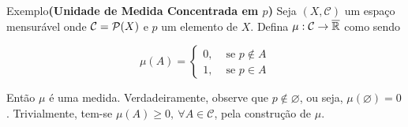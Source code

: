 \begin{env}{Exemplo}\textbf{(Unidade de Medida Concentrada em $p$)}
\label{ex:medida-concentrada-em-p}
    Seja $(X, \mathcal{C})$ um espaço mensurável onde $\operatorname{\mathcal{C}} = \mathcal{P}(X)$ e $p$ um elemento de $X$.
    Defina $\mu: \mathcal{C} \to \operatorname{\overline{\mathbb{R}}}$  como sendo

$$\mu(A) = \left\{\begin{array}{cc}
0, & \textrm{\ se \ } p \notin A \\
1, & \textrm{\ se \ } p \in A 
\end{array}\right.$$


Então $\mu$ é uma medida.
Verdadeiramente, observe que $p \notin \varnothing$, ou seja, $\mu(\varnothing) = 0$.
Trivialmente, tem-se $\mu(A) \geq 0,\ \forall A \in \mathcal{C}$, pela construção de $\mu$.


\end{env}
\begin{comment}
	

\begin{env}{Exemplo}
	\label{ex: função característica é uma medida}
	Seja $\cc$ uma \sigal e $E \subset \cc$.
	A função característica $\chi_{E}: \cc \to \R$ é uma medida sobre $\cc$.
	De fato, $\chi_{\varnothing} = 0$, pois não há elementos em $\varnothing$.
	Pela definição de função característica, temos que $\chi_E(x) \neq 0$ para qualquer que seja $E \in \cc$.
	Por fim, Se $(E_n)$ é uma sequência disjunta de elementos de $\cc$, sempre temos $\chi_{\bigcap_{n \in \N}E_n} = 0$.
	Caso $\chi_{\bigcup_{n \in \N}E_n}(x) = 0$, então $x \notin \bigcup_{n \in \N}E_n$. 
	Logo, $x \notin E_n,\ \forall n \in \N$.
	Logo, $\chi_{E_n}(x) = 0$ para qualquer que seja $n \in \N$, 
	Com isso, $\dsum_{n \in \N} \chi_{E_n}(x) = 0 = \chi_{\bigcup_{n \in \N}E_n}(x)$.
	
	Caso ocorra que  $\chi_{\bigcup_{n \in \N}E_n}(x) = 1$, então existe um $n_0 \in \N$ tal que $ x \in E_{n_0}$.
	Como a sequência de conjuntos é disjunta, o $n_0$ é único.
	Logo, $x \notin E_p$ para qualquer $p \neq n_0$, ou seja, $\chi_{E_p}(x) = 0, \ \forall p \neq n_0$.
	Com isso, $\dsum_{p \neq n_0} \chi_{E_p}(x) + \chi_{E_{n_0}}(x) = 0 + 1 =  \chi_{\bigcup_{n \in \N}E_n}(x)$.
	Em todo caso, $\chi_{\bigcup_{n \in \N}E_n}(x) = \dsum_{n \in \N} \chi_{E_n}(x)$. 
	Portanto, $\chi_E$ é uma medida.
\end{env}
\end{comment}



